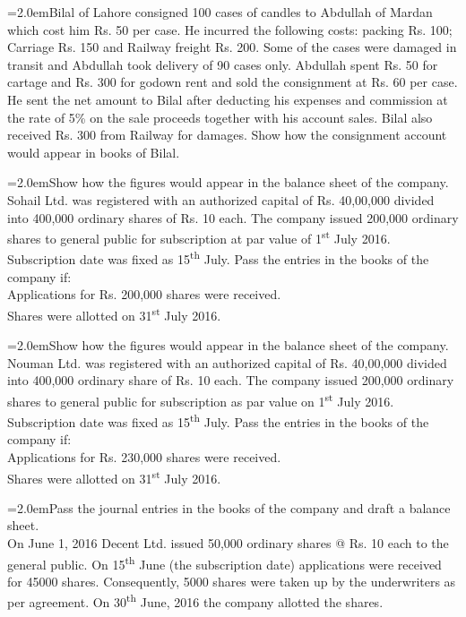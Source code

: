 \documentclass[11pt,a4paper]{article}
\newcommand{\lqn}[2]{\Needspace{6\baselineskip}\par\medskip\noindent\hangindent=2.0em\hangafter=1\makebox[2.0em][l]{\textbf{#1.}}#2\par}
\begin{document}
\lqn{46}{Bilal of Lahore consigned 100 cases of candles to Abdullah of Mardan which cost him Rs. 50 per case. He incurred the following costs: packing Rs. 100; Carriage Rs. 150 and Railway freight Rs. 200. Some of the cases were damaged in transit and Abdullah took delivery of 90 cases only. Abdullah spent Rs. 50 for cartage and Rs. 300 for godown rent and sold the consignment at Rs. 60 per case. He sent the net amount to Bilal after deducting his expenses and commission at the rate of 5\% on the sale proceeds together with his account sales. Bilal also received Rs. 300 from Railway for damages. Show how the consignment account would appear in books of Bilal.\par
}
\lqn{47}{Show how the figures would appear in the balance sheet of the company.\\
Sohail Ltd. was registered with an authorized capital of Rs. 40,00,000 divided into 400,000 ordinary shares of Rs. 10 each. The company issued 200,000 ordinary shares to general public for subscription at par value of 1\textsuperscript{st}  July 2016. Subscription date was fixed as 15\textsuperscript{th}  July. Pass the entries in the books of the company if:\\
Applications for Rs. 200,000 shares were received.\\
Shares were allotted on 31\textsuperscript{st}  July 2016.\par
}
\lqn{48}{Show how the figures would appear in the balance sheet of the company.\\
Nouman Ltd. was registered with an authorized capital of Rs. 40,00,000 divided into 400,000 ordinary share of Rs. 10 each. The company issued 200,000 ordinary shares to general public for subscription as par value on 1\textsuperscript{st}  July 2016. Subscription date was fixed as 15\textsuperscript{th}  July. Pass the entries in the books of the company if:\\
Applications for Rs. 230,000 shares were received.\\
Shares were allotted on 31\textsuperscript{st}  July 2016.\par
}
\lqn{49}{Pass the journal entries in the books of the company and draft a balance sheet.\\
On June 1, 2016 Decent Ltd. issued 50,000 ordinary shares @ Rs. 10 each to the general public. On 15\textsuperscript{th}  June (the subscription date) applications were received for 45000 shares. Consequently, 5000 shares were taken up by the underwriters as per agreement. On 30\textsuperscript{th}  June, 2016 the company allotted the shares.\par
}
\end{document}
